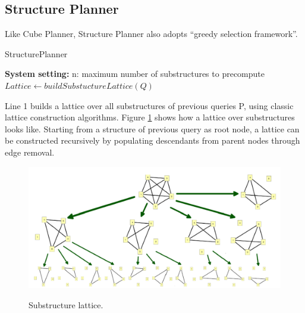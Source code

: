 \subsection{Structure Planner}
\label{Structure Planner}
Like Cube Planner, Structure Planner also adopts ``greedy selection framework''.

\begin{algorithm}[H]
	\caption{StructurePlanner}
	\LinesNumbered 
	\textbf{System setting:} n: maximum number of substructures to precompute\\ 
	$Lattice \leftarrow buildSubstuctureLattice(Q)$\;
	
\end{algorithm}
\clearpage

Line 1 builds a lattice over all substructures of previous queries P, using classic lattice construction algorithms. Figure \ref{fig:4:3} shows how a lattice over substructures looks like. Starting from a structure of previous query as root node, a lattice can be constructed recursively by populating descendants from parent nodes through edge removal.

\begin {figure}[H]
\centering
\includegraphics[scale=0.3]{pic/42.png}
\caption{Substructure lattice.}
\label{fig:4:3}
\end{figure}


